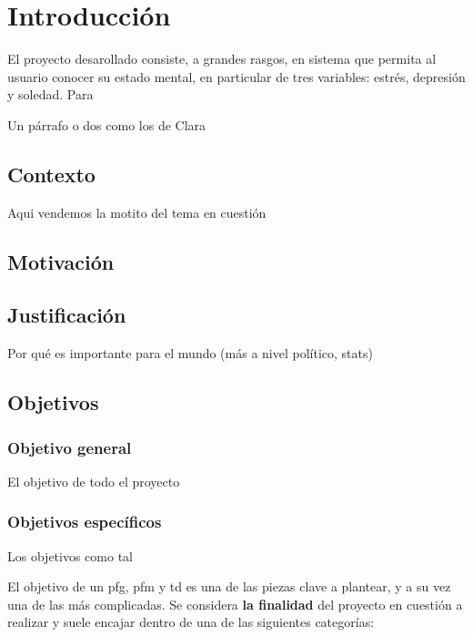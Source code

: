 \chapter{Introducción}
\label{chapter:introduccion}


El proyecto desarollado consiste, a grandes rasgos, en sistema que permita al usuario conocer su estado mental, en 
particular de tres variables: estrés, depresión y soledad. Para


Un párrafo o dos como los de Clara

\section{Contexto}

Aqui vendemos la motito del tema en cuestión

\section{Motivación}

\section{Justificación}

Por qué es importante para el mundo (más a nivel político, stats)

\section{Objetivos}

    \subsection{Objetivo general}

    El objetivo de todo el proyecto

    \subsection{Objetivos específicos}


    Los objetivos como tal


        El objetivo de un \gls{pfg}, \gls{pfm} y  \gls{td} es una de las piezas clave a plantear, y a su vez una de las más complicadas. Se considera \textbf{la finalidad} del proyecto en cuestión a realizar y suele encajar dentro de una de las siguientes categorías:

